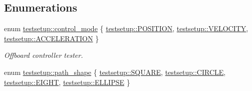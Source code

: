 \subsection*{Enumerations}
\begin{DoxyCompactItemize}
\item 
enum \mbox{\hyperlink{group__sitl__test_ga9930fec0e85d9181d854dcce4228fabc}{testsetup\+::control\+\_\+mode}} \{ \mbox{\hyperlink{group__sitl__test_gga9930fec0e85d9181d854dcce4228fabca7dfb3fa5c34c3d6d2f3a550112bf2150}{testsetup\+::\+P\+O\+S\+I\+T\+I\+ON}}, 
\mbox{\hyperlink{group__sitl__test_gga9930fec0e85d9181d854dcce4228fabca115c50ce38c0786c1a426fcc448c5ca1}{testsetup\+::\+V\+E\+L\+O\+C\+I\+TY}}, 
\mbox{\hyperlink{group__sitl__test_gga9930fec0e85d9181d854dcce4228fabca7fc2250d8164a6ad63d166c01c0f004a}{testsetup\+::\+A\+C\+C\+E\+L\+E\+R\+A\+T\+I\+ON}}
 \}
\begin{DoxyCompactList}\small\item\em Offboard controller tester. \end{DoxyCompactList}\item 
enum \mbox{\hyperlink{group__sitl__test_gad3657f391114032d03b465fccb47befa}{testsetup\+::path\+\_\+shape}} \{ \mbox{\hyperlink{group__sitl__test_ggad3657f391114032d03b465fccb47befaaae0dd73f6e88593569286ac6170d2ea3}{testsetup\+::\+S\+Q\+U\+A\+RE}}, 
\mbox{\hyperlink{group__sitl__test_ggad3657f391114032d03b465fccb47befaa3865ccc00605d98b2623d71800e065b8}{testsetup\+::\+C\+I\+R\+C\+LE}}, 
\mbox{\hyperlink{group__sitl__test_ggad3657f391114032d03b465fccb47befaa0412369f29b1207be79090ec6e24ca64}{testsetup\+::\+E\+I\+G\+HT}}, 
\mbox{\hyperlink{group__sitl__test_ggad3657f391114032d03b465fccb47befaad38385721e4aa330ebf9d94f6446b885}{testsetup\+::\+E\+L\+L\+I\+P\+SE}}
 \}
\end{DoxyCompactItemize}
